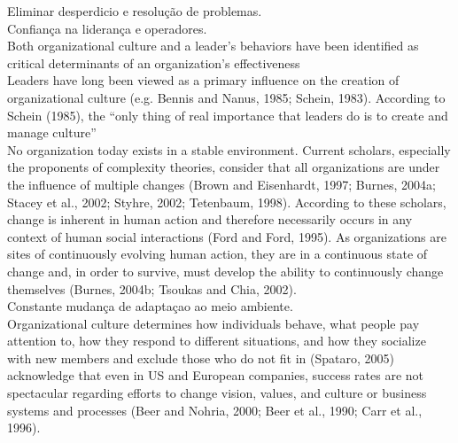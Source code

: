 Eliminar desperdicio e resolução de problemas.\\

Confiança na liderança e operadores.\\

Both organizational culture and a leader’s behaviors have been identified as critical determinants of an organization’s effectiveness\\

Leaders have long been viewed as a primary influence on the creation of organizational culture (e.g. Bennis and Nanus, 1985; Schein, 1983). According to Schein (1985), the “only thing of real importance that leaders do is to create and manage culture”\\






No organization today exists in a stable environment. Current scholars, especially the
proponents of complexity theories, consider that all organizations are under the influence
of multiple changes (Brown and Eisenhardt, 1997; Burnes, 2004a; Stacey et al., 2002;
Styhre, 2002; Tetenbaum, 1998). According to these scholars, change is inherent in
human action and therefore necessarily occurs in any context of human social interactions
(Ford and Ford, 1995). As organizations are sites of continuously evolving human action,
they are in a continuous state of change and, in order to survive, must develop the ability
to continuously change themselves (Burnes, 2004b; Tsoukas and Chia, 2002).\\

Constante mudança de adaptaçao ao meio ambiente.\\


Organizational culture determines how individuals behave, what people pay attention to,
how they respond to different situations, and how they socialize with new members and
exclude those who do not fit in (Spataro, 2005) \\

acknowledge that even in US and European companies, success rates are
not spectacular regarding efforts to change vision, values, and culture or business systems
and processes (Beer and Nohria, 2000; Beer et al., 1990; Carr et al., 1996).\\

